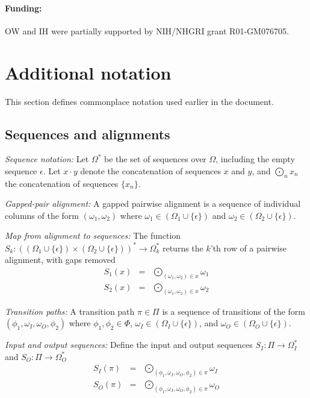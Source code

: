 \documentclass{article}
\newcommand\gappedalphabet[1]{(\Omega_{#1} \cup \{\epsilon\})}
\newcommand\gappedpair[2]{\gappedalphabet{#1} \times \gappedalphabet{#2}}
\newcommand\States{\Phi}
\begin{document}
\paragraph{Funding:} OW and IH were partially supported by NIH/NHGRI grant R01-GM076705.

\appendix
\section{Additional notation}
This section defines commonplace notation used earlier in the document.
\subsection{Sequences and alignments}
{\em Sequence notation:}
Let $\Omega^\ast$ be the set of sequences over $\Omega$, including the empty sequence $\epsilon$.
Let $x \cdot y$ denote the concatenation of sequences $x$ and $y$, and $\bigodot_n x_n$ the concatenation of sequences $\{ x_n \}$.

{\em Gapped-pair alignment:}
A gapped pairwise alignment is a sequence of individual columns of the form $(\omega_1,\omega_2)$ where $\omega_1 \in \gappedalphabet{1}$ and $\omega_2 \in \gappedalphabet{2}$.

{\em Map from alignment to sequences:}
The function $S_k:\left(\gappedpair{1}{2}\right)^\ast \to \Omega_k^\ast$ returns the $k$'th row of a pairwise alignment, with gaps removed
\begin{eqnarray*}
S_1(x) & = & \bigodot_{(\omega_1,\omega_2) \in x} \omega_1 \\
S_2(x) & = & \bigodot_{(\omega_1,\omega_2) \in x} \omega_2
\end{eqnarray*}

{\em Transition paths:}
A transition path $\pi \in \Pi$ 
is a sequence of transitions of the form $(\phi_1,\omega_I,\omega_O,\phi_2)$
where
$\phi_1,\phi_2 \in \States$,
$\omega_I \in \gappedalphabet{I}$, and
$\omega_O \in \gappedalphabet{O}$.

{\em Input and output sequences:}
Define the input and output sequences
$S_I:\Pi \to \Omega_I^\ast$ and
$S_O:\Pi \to \Omega_O^\ast$
\begin{eqnarray*}
S_I(\pi) & = & \bigodot_{(\phi_1,\omega_I,\omega_O,\phi_2) \in \pi} \omega_I \\
S_O(\pi) & = & \bigodot_{(\phi_1,\omega_I,\omega_O,\phi_2) \in \pi} \omega_O
\end{eqnarray*}




\end{document}
